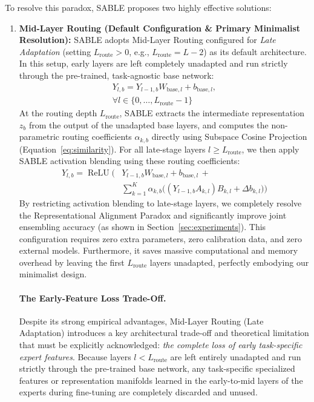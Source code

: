 To resolve this paradox, SABLE proposes two highly effective solutions:
\begin{enumerate}
    \item \textbf{Mid-Layer Routing (Default Configuration \& Primary Minimalist Resolution):} SABLE adopts Mid-Layer Routing configured for \emph{Late Adaptation} (setting $L_{\text{route}} > 0$, e.g., $L_{\text{route}} = L - 2$) as its default architecture. In this setup, early layers are left completely unadapted and run strictly through the pre-trained, task-agnostic base network:
    \begin{equation}
    \begin{aligned}
    Y_{l, b} = Y_{l-1, b} W_{\text{base}, l} + b_{\text{base}, l}, \\
    \forall l \in \{0, \dots, L_{\text{route}} - 1\}
    \end{aligned}
    \label{eq:mid_layer_early}
    \end{equation}
    At the routing depth $L_{\text{route}}$, SABLE extracts the intermediate representation $z_b$ from the output of the unadapted base layers, and computes the non-parametric routing coefficients $\alpha_{k, b}$ directly using Subspace Cosine Projection (Equation~\ref{eq:similarity}). 
    For all late-stage layers $l \ge L_{\text{route}}$, we then apply SABLE activation blending using these routing coefficients:
    \begin{equation}
    \begin{aligned}
    Y_{l, b} = \operatorname{ReLU}\Big( &Y_{l-1, b} W_{\text{base}, l} + b_{\text{base}, l} \,+ \\
    &\sum_{k=1}^K \alpha_{k, b} \big( (Y_{l-1, b} A_{k, l}) B_{k, l} + \Delta b_{k, l} \big) \Big)
    \end{aligned}
    \label{eq:mid_layer_blending}
    \end{equation}
    By restricting activation blending to late-stage layers, we completely resolve the Representational Alignment Paradox and significantly improve joint ensembling accuracy (as shown in Section~\ref{sec:experiments}). This configuration requires zero extra parameters, zero calibration data, and zero external models. Furthermore, it saves massive computational and memory overhead by leaving the first $L_{\text{route}}$ layers unadapted, perfectly embodying our minimalist design.

    \paragraph{The Early-Feature Loss Trade-Off.} Despite its strong empirical advantages, Mid-Layer Routing (Late Adaptation) introduces a key architectural trade-off and theoretical limitation that must be explicitly acknowledged: \emph{the complete loss of early task-specific expert features}. Because layers $l < L_{\text{route}}$ are left entirely unadapted and run strictly through the pre-trained base network, any task-specific specialized features or representation manifolds learned in the early-to-mid layers of the experts during fine-tuning are completely discarded and unused. 
    

\end{enumerate}
